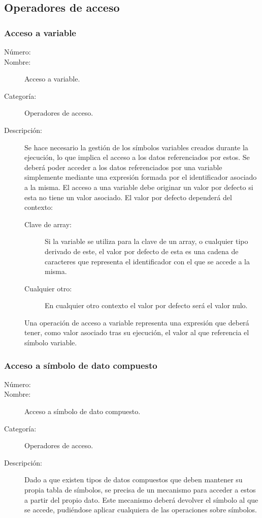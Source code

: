 \subsection{Operadores de acceso}
\subsubsection{Acceso a variable}
\begin{framed}
	\begin{description}
		\item [Número:] \cn
		\item [Nombre:] Acceso a variable.
		\item [Categoría:] Operadores de acceso.
		\item [Descripción:] Se hace necesario la gestión de los símbolos variables creados durante la ejecución, lo que implica el
		acceso a los datos referenciados por estos. Se deberá poder acceder a los datos referenciados por una variable
		simplemente mediante una expresión formada por el identificador asociado a la misma. El acceso a una variable debe originar un
		valor por defecto si esta no tiene un valor asociado. El valor por defecto dependerá del contexto:  
		\begin{description}
			\item[Clave de array:] Si la variable se utiliza para la clave de un array, o cualquier tipo
			derivado de este, el valor por defecto de esta es una cadena de caracteres que representa
			el identificador con el que se accede a la misma.
			\item [Cualquier otro:] En cualquier otro contexto el valor por defecto será el valor nulo.
		\end{description}
		Una operación de acceso a variable representa una expresión que deberá tener, como valor asociado tras su ejecución, el valor al
		que referencia el símbolo variable.
	\end {description}
\end{framed}


\subsubsection{Acceso a símbolo de dato compuesto}
\begin{framed}
	\begin{description}
		\item [Número:] \cn
		\item [Nombre:] Acceso a símbolo de dato compuesto.
		\item [Categoría:] Operadores de acceso.
		\item [Descripción:] Dado a que existen tipos de datos compuestos que deben mantener su propia tabla de símbolos,
		se precisa de un mecanismo para acceder a estos a partir del propio dato. Este mecanismo deberá devolver el símbolo al que se
		accede, pudiéndose aplicar cualquiera de las operaciones sobre símbolos.
	\end {description}
\end{framed}

